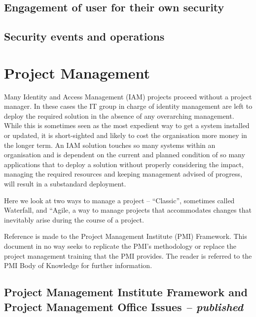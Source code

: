 \hypertarget{engagement-of-user-for-their-own-security}{%
\section{Engagement of user for their own
security}\label{engagement-of-user-for-their-own-security}}

\hypertarget{security-events-and-operations}{%
\section{Security events and
operations}\label{security-events-and-operations}}

\hypertarget{project-management}{%
\chapter{Project Management}\label{project-management}}

Many Identity and Access Management (IAM) projects proceed without a
project manager. In these cases the IT group in charge of identity
management are left to deploy the required solution in the absence of
any overarching management. While this is sometimes seen as the most
expedient way to get a system installed or updated, it is short-sighted
and likely to cost the organisation more money in the longer term. An
IAM solution touches so many systems within an organisation and is
dependent on the current and planned condition of so many applications
that to deploy a solution without properly considering the impact,
managing the required resources and keeping management advised of
progress, will result in a substandard deployment.

Here we look at two ways to manage a project -- ``Classic'', sometimes
called Waterfall, and ``Agile, a way to manage projects that
accommodates changes that inevitably arise during the course of a
project.

Reference is made to the Project Management Institute (PMI) Framework.
This document in no way seeks to replicate the PMI's methodology or
replace the project management training that the PMI provides. The
reader is referred to the PMI Body of Knowledge for further information.

\hypertarget{project-management-institute-framework-and-project-management-office-issues-published}{%
\section{\texorpdfstring{Project Management Institute Framework and
Project Management Office Issues \emph{--
published}}{Project Management Institute Framework and Project Management Office Issues -- published}}\label{project-management-institute-framework-and-project-management-office-issues-published}}


